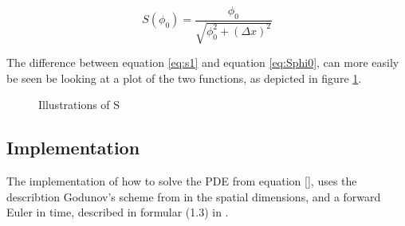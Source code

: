 \begin{equation}
\label{eq:Sphi0}
S(\phi_0) = \frac{\phi_0}{\sqrt{\phi_0^2 + (\Delta x)^2}}
\end{equation}

The difference between equation \eqref{eq:s1} and equation
\eqref{eq:Sphi0}, can more easily be seen be looking at a plot of the
two functions, as depicted in figure \ref{fig:s-graph}.

\begin{figure}[h]
\begin{center}
\end{center}
\caption{Illustrations of S}
\label{fig:s-graph}
\end{figure}



\pagebreak
\subsection{Implementation}
The implementation of how to solve the PDE from equation \eqref{},
uses the describtion Godunov's scheme from 
in the spatial dimensions, and a forward Euler in time, described in
formular (1.3) in .

